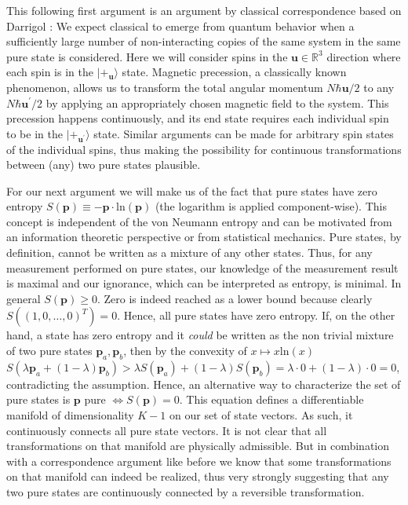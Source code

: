 \documentclass[11pt, a4paper]{article}
\newcommand{\R}{\mathbb{R}}
\begin{document}
\vspace{8pt}
This following first argument is an argument by classical correspondence based on Darrigol \cite{DARRIGOL}: We expect classical to emerge from quantum behavior when a sufficiently large number of non-interacting copies of the same system in the same pure state is considered. Here we will consider spins in the $\mathbf u\in\R^3$ direction where each spin is in the $|+_{\mathbf u}\rangle$ state. Magnetic precession, a classically known phenomenon, allows us to transform the total angular momentum $N\hbar\mathbf u/2$ to any $N\hbar\mathbf u^\prime/2$ by applying an appropriately chosen magnetic field to the system. This precession happens continuously, and its end state requires each individual spin to be in the $|+_{\mathbf u^\prime}\rangle$ state. Similar arguments can be made for arbitrary spin states of the individual spins, thus making the possibility for continuous transformations between (any) two pure states plausible.\par
For our next argument we will make us of the fact that pure states have zero entropy $S(\mathbf p)\equiv-\mathbf p\cdot\mathrm{ln}\left(\mathbf p\right)$ (the logarithm is applied component-wise). This concept is independent of the von Neumann entropy and can be motivated from an information theoretic perspective or from statistical mechanics. Pure states, by definition, cannot be written as a mixture of any other states. Thus, for any measurement performed on pure states, our knowledge of the measurement result is maximal and our ignorance, which can be interpreted as entropy, is minimal. In general $S(\mathbf p)\geq 0$. Zero is indeed reached as a lower bound because clearly $S((1,0,\ldots,0)^T)=0$. Hence, all pure states have zero entropy. If, on the other hand, a state has zero entropy and it \emph{could} be written as the non trivial mixture of two pure states $\mathbf p_a,\mathbf p_b$, then by the convexity of $x\mapsto x\mathrm{ln}\left(x\right)$ $S(\lambda \mathbf p_a + (1-\lambda)\mathbf p_b)>\lambda S(\mathbf p_a)+(1-\lambda)S(\mathbf p_b)=\lambda\cdot 0 + (1-\lambda)\cdot 0=0$, contradicting the assumption. Hence, an alternative way to characterize the set of pure states is $\mathbf p$ pure $\iff S(\mathbf p)=0$. This equation defines a differentiable manifold of dimensionality $K-1$ on our set of state vectors. As such, it continuously connects all pure state vectors. It is not clear that all transformations on that manifold are physically admissible. But in combination with a correspondence argument like before we know that some transformations on that manifold can indeed be realized, thus very strongly suggesting that any two pure states are continuously connected by a reversible transformation.\par
\end{document}
